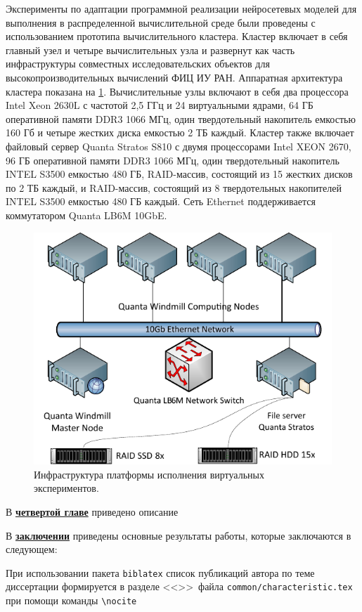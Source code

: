 Эксперименты по адаптации программной реализации нейросетевых моделей для выполнения в распределенной 
вычислительной среде были проведены с использованием прототипа вычислительного кластера. Кластер включает в 
себя главный узел и четыре вычислительных узла и развернут как часть инфраструктуры совместных исследовательских 
объектов для высокопроизводительных вычислений ФИЦ ИУ РАН. Аппаратная архитектура кластера показана на 
\cref{fig:lab_cluster}. Вычислительные узлы включают в себя два процессора Intel Xeon 2630L с частотой 2,5 ГГц и 
24 виртуальными ядрами, 64 ГБ оперативной памяти DDR3 1066 МГц, один твердотельный накопитель емкостью 160 Гб и 
четыре жестких диска емкостью 2 ТБ каждый. Кластер также включает файловый сервер Quanta Stratos S810 с двумя 
процессорами Intel XEON 2670, 96 ГБ оперативной памяти DDR3 1066 МГц, один твердотельный накопитель INTEL S3500 
емкостью 480 ГБ, RAID-массив, состоящий из 15 жестких дисков по 2 ТБ каждый, и RAID-массив, состоящий из 
8 твердотельных накопителей INTEL S3500 емкостью 480 ГБ каждый. Сеть Ethernet поддерживается коммутатором 
Quanta LB6M 10GbE.


\begin{figure}[h!]
    \centering
    \includegraphics[width=0.7\linewidth]{images/lab_cluster.pdf}
    \caption{Инфраструктура платформы исполнения виртуальных экспериментов.}\label{fig:lab_cluster}
\end{figure}

В \underline{\textbf{четвертой главе}} приведено описание

\FloatBarrier
{}                                  %
В \underline{\textbf{заключении}} приведены основные результаты работы, которые заключаются в следующем:


При использовании пакета \verb!biblatex! список публикаций автора по теме
диссертации формируется в разделе <<\publications>>\ файла
\verb!common/characteristic.tex!  при помощи команды \verb!\nocite!

